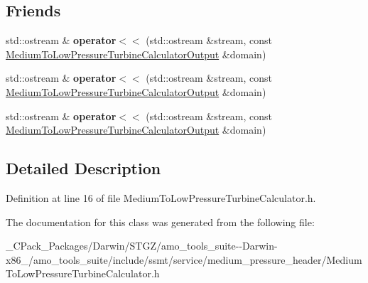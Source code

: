 \subsection*{Friends}
\begin{DoxyCompactItemize}
\item 
\mbox{\label{class_medium_to_low_pressure_turbine_calculator_output_aeb8da4ee915b2ef659d388860d99da0c}} 
std\+::ostream \& {\bfseries operator$<$$<$} (std\+::ostream \&stream, const \hyperlink{class_medium_to_low_pressure_turbine_calculator_output}{Medium\+To\+Low\+Pressure\+Turbine\+Calculator\+Output} \&domain)
\item 
\mbox{\label{class_medium_to_low_pressure_turbine_calculator_output_aeb8da4ee915b2ef659d388860d99da0c}} 
std\+::ostream \& {\bfseries operator$<$$<$} (std\+::ostream \&stream, const \hyperlink{class_medium_to_low_pressure_turbine_calculator_output}{Medium\+To\+Low\+Pressure\+Turbine\+Calculator\+Output} \&domain)
\item 
\mbox{\label{class_medium_to_low_pressure_turbine_calculator_output_aeb8da4ee915b2ef659d388860d99da0c}} 
std\+::ostream \& {\bfseries operator$<$$<$} (std\+::ostream \&stream, const \hyperlink{class_medium_to_low_pressure_turbine_calculator_output}{Medium\+To\+Low\+Pressure\+Turbine\+Calculator\+Output} \&domain)
\end{DoxyCompactItemize}


\subsection{Detailed Description}


Definition at line 16 of file Medium\+To\+Low\+Pressure\+Turbine\+Calculator.\+h.



The documentation for this class was generated from the following file\+:\begin{DoxyCompactItemize}
\item 
\+\_\+\+C\+Pack\+\_\+\+Packages/\+Darwin/\+S\+T\+G\+Z/amo\+\_\+tools\+\_\+suite-\/-\/\+Darwin-\/x86\+\_/amo\+\_\+tools\+\_\+suite/include/ssmt/service/medium\+\_\+pressure\+\_\+header/Medium\+To\+Low\+Pressure\+Turbine\+Calculator.\+h\end{DoxyCompactItemize}
